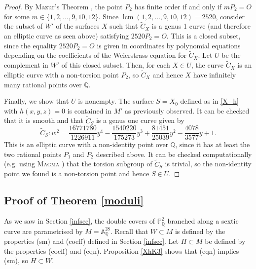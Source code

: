 \documentclass[11pt]{amsart}
\newcommand{\QQ}{\mathbb{Q}}
\newcommand{\PP}{\mathbb{P}}
\theoremstyle{plain}
\theoremstyle{remark}
\begin{document}
\begin{proof}
By Mazur's Theorem \cite[Theorem III.5.1]{Mazur}, the point $P_2$ has finite order if and only if $mP_2=O$ for some $m\in \{1,2,\dots,9,10,12\}$. Since $\operatorname{lcm}(1,2,\dots, 9, 10, 12)=2520$, consider the subset of $W'$ of the surfaces $X$ such that $\widetilde{C}_X$ is a genus 1 curve (and therefore an elliptic curve as seen above) satisfying $2520P_2=O$. This is a closed subset, since the equality $2520P_2=O$ is given in coordinates by polynomial equations depending on the coefficients of the Weierstrass equation for $\widetilde{C}_X$. Let $U$ be the complement in $W'$ of this closed subset. Then, for each $X\in U$, the curve $\widetilde{C}_X$ is an elliptic curve with a non-torsion point $P_2$, so $\widetilde{C}_X$ and hence $X$ have infinitely many rational points over $\QQ$.

Finally, we show that $U$ is nonempty. The surface $S=X_0$ defined as in \eqref{X_h} with $h(x,y,z)=0$ is contained in $M'$ as previously observed. It can be checked that it is smooth and that $\widetilde{C}_S$ is a genus one curve given by
\[
\widetilde{C}_S: w^2=\frac{16771780}{1226911}y^4 - \frac{1540220}{175273}y^3 + \frac{81451}{25039}y^2 - \frac{4078}{3577}y + 1.
\]
This is an elliptic curve with a non-identity point over $\QQ$, since it has at least the two rational points $P_1$ and $P_2$ described above. It can be checked computationally (e.g. using \textsc{Magma} \cite{magma}) that the torsion subgroup of $\widetilde{C}_S$ 
is trivial, so the non-identity point we found is a non-torsion point and hence $S\in U$. 
\end{proof}

\subsection{Proof of Theorem \ref{moduli}}
As we saw in Section \ref{infsec}, the double covers of $\PP^2_\QQ$ branched along a sextic curve are parametrised by $M=\mathbb{A}^{28}_\QQ$. Recall that $W\subset M$ is defined by the properties (sm) and (coeff) defined in Section \ref{infsec}. Let $H\subset M$ be defined by the properties (coeff) and (eqn). Proposition \ref{XhK3} shows that (eqn) implies (sm), so $H\subset W$.
\end{document}
